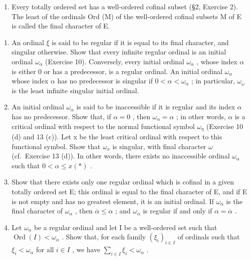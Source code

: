 \begin{enumerate}
\def\labelenumi{\arabic{enumi}.}
\setcounter{enumi}{15}
\tightlist
\item
  Every totally ordered set has a well-ordered cofinal subset (§2, Exercise 2). The least of the ordinals Ord (M) of the well-ordered cofinal subsets M of E is called the final character of E.
\end{enumerate}

\begin{enumerate}
\def\labelenumi{(\alph{enumi})}
\item
  An ordinal \(\xi\) is said to be regular if it is equal to its final character, and singular otherwise. Show that every infinite regular ordinal is an initial ordinal \(\omega_{\alpha}\) (Exercise 10). Conversely, every initial ordinal \(\omega_{\alpha}\) , whose index \(\alpha\) is either 0 or has a predecessor, is a regular ordinal. An initial ordinal \(\omega_{\alpha}\) whose index \(\alpha\) has no predecessor is singular if \(0 < \alpha < \omega_{\alpha}\) ; in particular, \(\omega_{\omega}\) is the least infinite singular initial ordinal.
\item
  An initial ordinal \(\omega_{\alpha}\) is said to be inaccessible if it is regular and its index \(\alpha\) has no predecessor. Show that, if \(\alpha = 0\) , then \(\omega_{\alpha} = \alpha\) ; in other words, \(\alpha\) is a critical ordinal with respect to the normal functional symbol \(\omega_{\eta}\) (Exercise 10 (d) and 13 (c)). Let x be the least critical ordinal with respect to this functional symbol. Show that \(\omega_{x}\) is singular, with final character \(\omega\) (cf.~Exercise 13 (d)). In other words, there exists no inaccessible ordinal \(\omega_{\alpha}\) such that \(0 < \alpha \leqslant x (*)\) .
\item
  Show that there exists only one regular ordinal which is cofinal in a given totally ordered set E; this ordinal is equal to the final character of E, and if E is not empty and has no greatest element, it is an initial ordinal. If \(\omega_{\overline{\alpha}}\) is the final character of \(\omega_{\alpha}\) , then \(\overline{\alpha} \leqslant \alpha\) ; and \(\omega_{\alpha}\) is regular if and only if \(\alpha = \overline{\alpha}\) .
\item
  Let \(\omega_{\alpha}\) be a regular ordinal and let I be a well-ordered set such that \(\operatorname{Ord}(I) < \omega_{\alpha}\) . Show that, for each family \((\xi_{i})_{i \in I}\) of ordinals such that \(\xi_{i} < \omega_{\alpha}\) for all \(i \in I\) , we have \(\sum_{i \in I} \xi_{i} < \omega_{\alpha}\) .
\end{enumerate}

